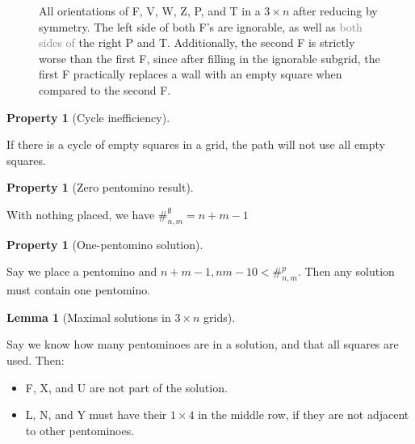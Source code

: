 \documentclass{article}
\theoremstyle{definition}%
\newtheorem{lemma}[theorem]{Lemma}
\newtheorem{property}[theorem]{Property}
\newcommand{\minordetail}[1]{\textcolor{gray}{#1}}
\begin{document}
\begin{figure}
    \caption{All orientations of F, V, W, Z, P, and T in a $3 \times n$ after reducing by symmetry. The left side of both F's are ignorable, as well as \minordetail{both sides of} the right P and T. Additionally, the second F is strictly worse than the first F, since after filling in the ignorable subgrid, the first F practically replaces a wall with an empty square when compared to the second F.}
    \label{fig:Reduced orientations}
\end{figure}

\begin{property}[Cycle inefficiency]
\label{prop:cycineff}

If there is a cycle of empty squares in a grid, the path will not use all empty squares.
\end{property}

\begin{property}[Zero pentomino result]
\label{prop:zeroplace}

With nothing placed, we have $\#^{\emptyset}_{n, m} = n + m - 1$
\end{property}

\begin{property}[One-pentomino solution]
\label{prop:oneplace}

Say we place a pentomino and $n + m - 1, nm - 10 < \#^p_{n, m}$. Then any solution must contain one pentomino.
\end{property}

\begin{lemma}[Maximal solutions in $3 \times n$ grids]
\label{lem:max3x3}

Say we know how many pentominoes are in a solution, and that all squares are used. Then:
\begin{itemize}
    \item F, X, and U are not part of the solution.
    \item L, N, and Y must have their $1 \times 4$ in the middle row, if they are not adjacent to other pentominoes.
\end{itemize}
\end{lemma}
\end{document}
